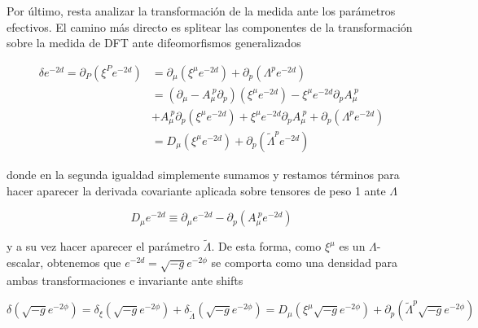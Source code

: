 \documentclass{article}
\numberwithin{equation}{section}
\begin{document}
\vspace{.5cm}

Por último, resta analizar la transformación de la medida ante los parámetros efectivos. El camino más directo es splitear las componentes de la transformación sobre la medida de DFT ante difeomorfismos generalizados

\begin{equation}
\begin{aligned}
\delta e^{-2 d} = \partial_P \left( \xi^P e^{-2 d}\right) &= \partial_{\mu} \left( \xi^{\mu} e^{-2 d}\right) + \partial_p \left( \Lambda^p e^{-2 d}\right)\\
&= \left(\partial_{\mu} - A_{\mu}^{\ p} \partial_p \right)\left( \xi^{\mu} e^{-2 d}\right) -\xi^{\mu} e^{-2 d} \partial_p A_{\mu}^{\ p}\\
&+ A_{\mu}^{\ p} \partial_p\left( \xi^{\mu} e^{-2 d}\right) + \xi^{\mu} e^{-2 d} \partial_p A_{\mu}^{\ p} + \partial_p \left( \Lambda^p e^{-2 d}\right)\\
&= D_{\mu}\left( \xi^{\mu} e^{-2 d}\right) + \partial_p \left( \widetilde{\Lambda}^p e^{-2 d}\right) 
\end{aligned}
\end{equation}

donde en la segunda igualdad simplemente sumamos y restamos términos para hacer aparecer la derivada covariante aplicada sobre tensores de peso 1 ante $ \Lambda $

\begin{equation}\label{Dcovdensidad}
D_{\mu} e^{-2d} \equiv \partial_{\mu}e^{-2d} - \partial_p \left( A_{\mu}^{\ p} e^{-2d} \right) 
\end{equation}

y a su vez hacer aparecer el parámetro $ \widetilde{\Lambda} $. De esta forma, como $ \xi^{\mu} $ es un $ \Lambda$-escalar, obtenemos que $ e^{-2d}=\sqrt{-g}e^{-2\phi} $ se comporta como una densidad para ambas transformaciones e invariante ante shifts

\begin{boxeq}
	\begin{equation}\label{deltamedida}
	\delta \left( \sqrt{-g} e^{-2\phi}\right) = \delta_{\xi} \left( \sqrt{-g} e^{-2\phi}\right) + \delta_{\widetilde{\Lambda}} \left( \sqrt{-g} e^{-2\phi}\right) = D_{\mu}\left( \xi^{\mu} \sqrt{-g} e^{-2 \phi}\right) + \partial_p \left( \widetilde{\Lambda}^p \sqrt{-g} e^{-2 \phi}\right) 
	\end{equation}
\end{boxeq}
\end{document}
